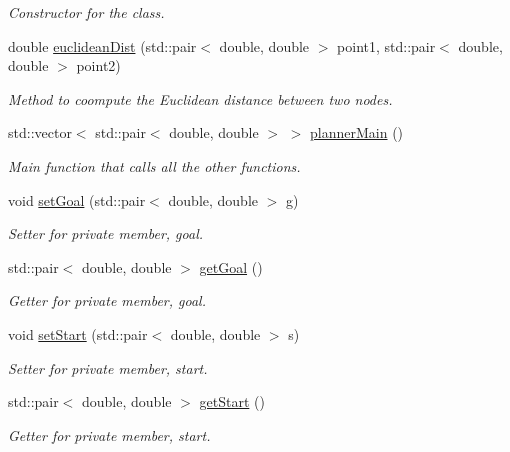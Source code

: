 \begin{DoxyCompactItemize}
\begin{DoxyCompactList}\small\item\em Constructor for the class. \end{DoxyCompactList}\item 
double \hyperlink{classPathPlanner_af535c5d5ee4efd61ce39e09263bdd91d}{euclidean\+Dist} (std\+::pair$<$ double, double $>$ point1, std\+::pair$<$ double, double $>$ point2)
\begin{DoxyCompactList}\small\item\em Method to coompute the Euclidean distance between two nodes. \end{DoxyCompactList}\item 
std\+::vector$<$ std\+::pair$<$ double, double $>$ $>$ \hyperlink{classPathPlanner_a0856952abd30c8afb7d010bc1f12f42c}{planner\+Main} ()
\begin{DoxyCompactList}\small\item\em Main function that calls all the other functions. \end{DoxyCompactList}\item 
void \hyperlink{classPathPlanner_a7ddf7846499907f012e5a3d24e040c26}{set\+Goal} (std\+::pair$<$ double, double $>$ g)
\begin{DoxyCompactList}\small\item\em Setter for private member, goal. \end{DoxyCompactList}\item 
std\+::pair$<$ double, double $>$ \hyperlink{classPathPlanner_aaaf398ecfee4b6a3a7d7249b2c033caa}{get\+Goal} ()
\begin{DoxyCompactList}\small\item\em Getter for private member, goal. \end{DoxyCompactList}\item 
void \hyperlink{classPathPlanner_ae689342fe07926fb9510783e2f07b991}{set\+Start} (std\+::pair$<$ double, double $>$ s)
\begin{DoxyCompactList}\small\item\em Setter for private member, start. \end{DoxyCompactList}\item 
std\+::pair$<$ double, double $>$ \hyperlink{classPathPlanner_ab803e1ce6ac612be78c8679f10d451b5}{get\+Start} ()
\begin{DoxyCompactList}\small\item\em Getter for private member, start. \end{DoxyCompactList}\item 

\end{DoxyCompactItemize}
